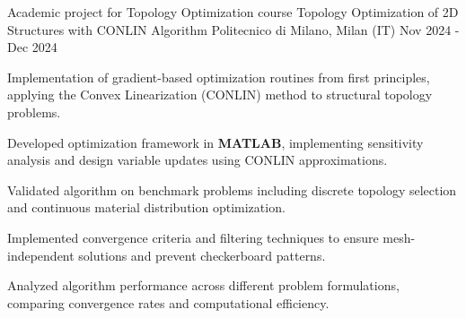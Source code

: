 
\cventry
{Academic project for Topology Optimization course}
{Topology Optimization of 2D Structures with CONLIN Algorithm}
{Politecnico di Milano, Milan (IT)}
{Nov 2024 - Dec 2024}
{
    Implementation of gradient-based optimization routines from first principles, applying the Convex Linearization (CONLIN) method to structural topology problems.
    \newline
    \vspace{4mm}
    \begin{cvitems}
        \item {Developed optimization framework in \textbf{MATLAB}, implementing sensitivity analysis and design variable updates using CONLIN approximations.}
        \item {Validated algorithm on benchmark problems including discrete topology selection and continuous material distribution optimization.}
        \item {Implemented convergence criteria and filtering techniques to ensure mesh-independent solutions and prevent checkerboard patterns.}
        \item {Analyzed algorithm performance across different problem formulations, comparing convergence rates and computational efficiency.}
    \end{cvitems}
}
